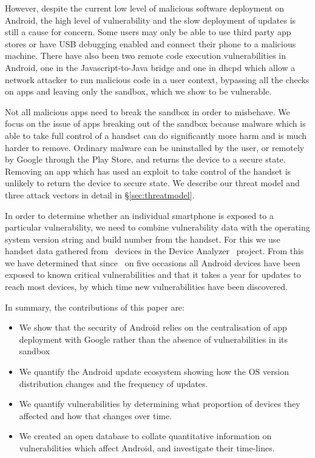 \documentclass{llncs}
\newcommand{\da}{Device Analyzer}
\begin{document}
However, despite the current low level of malicious software deployment on Android, the high level of vulnerability and the slow deployment of updates is still a cause for concern.
Some users may only be able to use third party app stores or have USB debugging enabled and connect their phone to a malicious machine.
There have also been two remote code execution vulnerabilities in Android, one in the Javascript-to-Java bridge and one in dhcpd which allow a network attacker to run malicious code in a user context, bypassing all the checks on apps and leaving only the sandbox, which we show to be vulnerable.

Not all malicious apps need to break the sandbox in order to misbehave.
We focus on the issue of apps breaking out of the sandbox because malware which is able to take full control of a handset can do significantly more harm and is much harder to remove.
Ordinary malware can be uninstalled by the user, or remotely by Google through the Play Store, and returns the device to a secure state. 
Removing an app which has used an exploit to take control of the handset is unlikely to return the device to secure state.
We describe our threat model and three attack vectors in detail in \S\ref{sec:threatmodel}.


In order to determine whether an individual smartphone is exposed to a particular vulnerability, we need to combine vulnerability data with the operating system version string and build number from the handset.
For this we use handset data gathered from \daNumOSDevices\ devices in the \da~\cite{Wagner2013} project.
From this we have determined that since \daStartDate\ on five occasions all Android devices have been exposed to known critical vulnerabilities and that it takes a year for updates to reach most devices, by which time new vulnerabilities have been discovered.


In summary, the contributions of this paper are:
\begin{itemize}
 \item We show that the security of Android relies on the centralisation of app deployment with Google rather than the absence of vulnerabilities in its sandbox
 \item We quantify the Android update ecosystem showing how the OS version distribution changes and the frequency of updates.
 \item We quantify vulnerabilities by determining what proportion of devices they affected and how that changes over time.
 \item We created an open database to collate quantitative information on vulnerabilities which affect Android, and investigate their time-lines.
\end{itemize}
\end{document}
